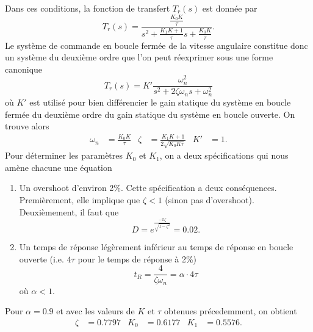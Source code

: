 \documentclass[frenchb, paper=a4, fontsize=11pt]{scrartcl}
\numberwithin{equation}{section}					%
\numberwithin{figure}{section}					%
\numberwithin{table}{section}						%
\begin{document}
Dans ces conditions, la fonction de transfert $T_r(s)$ est donnée
par
\begin{equation}
	T_r(s) = \frac{\frac{K_0K}{\tau}}{s^2 +\frac{K_1K+1}{\tau}s + \frac{K_0K}{\tau}}.
\end{equation}
Le système de commande en boucle fermée de la vitesse angulaire
constitue donc un système du deuxième ordre que l'on peut réexprimer
sous une forme canonique
\begin{equation}
	T_r(s) = K'\frac{\omega_n^2}{s^2 + 2\zeta\omega_n s+ \omega_n^2}
\end{equation}
où $K'$ est utilisé pour bien différencier le gain statique du système en
boucle fermée du deuxième ordre du gain statique du système en boucle
ouverte. On trouve alors
\begin{align}
	\omega_n & = \frac{K_0K}{\tau} & \zeta & = \frac{K_1K + 1}{2\sqrt{K_0K\tau}}
	& K' & = 1.
\end{align}
Pour déterminer les paramètres $K_0$ et $K_1$, on a deux spécifications
qui nous amène chacune une équation
\begin{enumerate}
	\item Un overshoot d'environ 2\%. Cette spécification a deux conséquences.
	Premièrement, elle implique que $\zeta < 1$ (sinon pas d'overshoot). Deuxièmement,
	il faut que
	\begin{equation}
		D = e^{\frac{-\pi\zeta}{\sqrt{1-\zeta^2}}} = 0.02.
	\end{equation}
	\item Un temps de réponse légèrement inférieur au temps de réponse en boucle
	ouverte (i.e. $4\tau$ pour le temps de réponse à 2\%)
	\begin{equation}
		t_R = \frac{4}{\zeta\omega_n} = \alpha \cdot 4\tau
	\end{equation}
	où $\alpha < 1$.
\end{enumerate}
Pour $\alpha = 0.9$ et avec les valeurs de $K$ et $\tau$ obtenues précedemment,
on obtient
\begin{align}
	\zeta & = 0.7797 & K_0 & = 0.6177 & K_1 & = 0.5576.
\end{align}
\end{document}
